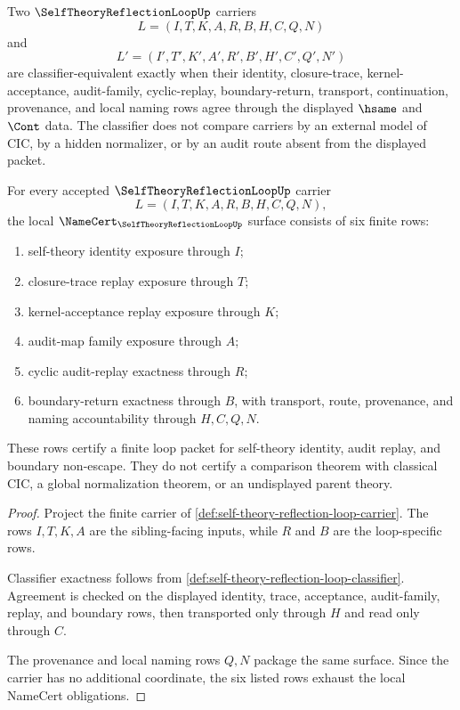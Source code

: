 \begin{definition}
\label{def:self-theory-reflection-loop-classifier}
Two $\SelfTheoryReflectionLoopUp$ carriers
$$
L=(I,T,K,A,R,B,H,C,Q,N)
$$
and
$$
L'=(I',T',K',A',R',B',H',C',Q',N')
$$
are classifier-equivalent exactly when their identity, closure-trace, kernel-acceptance, audit-family, cyclic-replay, boundary-return, transport, continuation, provenance, and local naming rows agree through the displayed $\hsame$ and $\Cont$ data. The classifier does not compare carriers by an external model of CIC, by a hidden normalizer, or by an audit route absent from the displayed packet.
\end{definition}

\begin{theorem}
\label{thm:self-theory-reflection-loop-namecert-obligations}
For every accepted $\SelfTheoryReflectionLoopUp$ carrier
$$
L=(I,T,K,A,R,B,H,C,Q,N),
$$
the local $\NameCert_{\SelfTheoryReflectionLoopUp}$ surface consists of six finite rows:
\begin{enumerate}
\item self-theory identity exposure through $I$;
\item closure-trace replay exposure through $T$;
\item kernel-acceptance replay exposure through $K$;
\item audit-map family exposure through $A$;
\item cyclic audit-replay exactness through $R$;
\item boundary-return exactness through $B$, with transport, route, provenance, and naming accountability through $H,C,Q,N$.
\end{enumerate}
These rows certify a finite loop packet for self-theory identity, audit replay, and boundary non-escape. They do not certify a comparison theorem with classical CIC, a global normalization theorem, or an undisplayed parent theory.
\end{theorem}
\begin{proof}
Project the finite carrier of \autoref{def:self-theory-reflection-loop-carrier}. The rows $I,T,K,A$ are the sibling-facing inputs, while $R$ and $B$ are the loop-specific rows.

Classifier exactness follows from \autoref{def:self-theory-reflection-loop-classifier}. Agreement is checked on the displayed identity, trace, acceptance, audit-family, replay, and boundary rows, then transported only through $H$ and read only through $C$.

The provenance and local naming rows $Q,N$ package the same surface. Since the carrier has no additional coordinate, the six listed rows exhaust the local NameCert obligations.
\end{proof}


